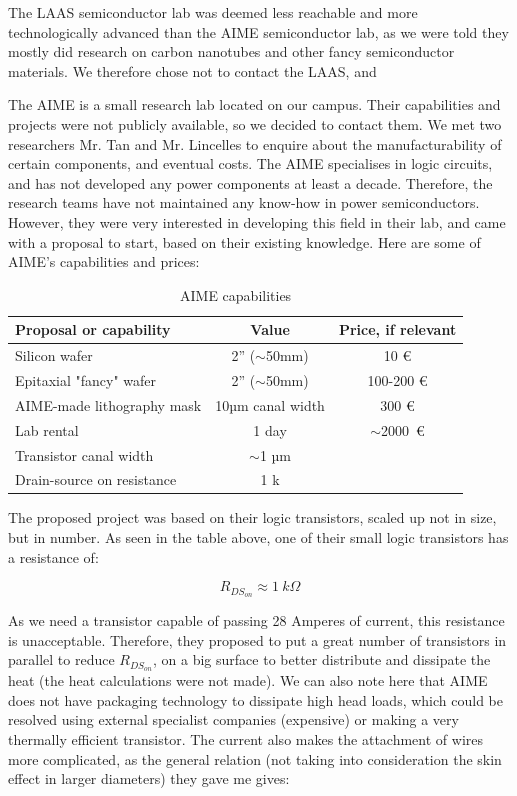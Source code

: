 The LAAS semiconductor lab was deemed less reachable and more technologically advanced than the AIME semiconductor lab, as we were told they mostly did research on carbon nanotubes and other fancy semiconductor materials. We therefore chose not to contact the LAAS, and 

The AIME is a small research lab located on our campus. Their capabilities and projects were not publicly available, so we decided to contact them. We met two researchers Mr. Tan and Mr. Lincelles to enquire about the manufacturability of certain components, and eventual costs. The AIME specialises in logic circuits, and has not developed any power components at least a decade. Therefore, the research teams have not maintained any know-how in power semiconductors. However, they were very interested in developing this field in their lab, and came with a proposal to start, based on their existing knowledge. Here are some of AIME's capabilities and prices:

\begin{table}[htbp]
	\caption{AIME capabilities}
	\label{tab:AIME_capabilities}
	\centering
	\begin{tabular}{lcc}
		\toprule
		\textbf{Proposal or capability} & \textbf{Value} & \textbf{Price, if relevant} \\
		\midrule
		Silicon wafer & 2'' ($\sim$50mm) & 10 € \\
		Epitaxial "fancy" wafer & 2'' ($\sim$50mm) & 100-200 €   \\
		AIME-made lithography mask &  10µm canal width & 300 € \\
		Lab rental & 1 day & $\sim$2000 € \\
		Transistor canal width & $\sim$1 µm \\
		Drain-source on resistance & 1 k\textOmega \\
		\bottomrule
	\end{tabular}
\end{table}

The proposed project was based on their logic transistors, scaled up not in size, but in number. As seen in the table above, one of their small logic transistors has a resistance of:

\begin{equation}
	R_{DS_{on}} \approx 1\ k\Omega
\end{equation}

As we need a transistor capable of passing 28 Amperes of current, this resistance is unacceptable. Therefore, they proposed to put a great number of transistors in parallel to reduce $R_{DS_{on}}$, on a big surface to better distribute and dissipate the heat (the heat calculations were not made). We can also note here that AIME does not have packaging technology to dissipate high head loads, which could be resolved using external specialist companies (expensive) or making a very thermally efficient transistor. The current also makes the attachment of wires more complicated, as the general relation (not taking into consideration the skin effect in larger diameters) they gave me gives:

